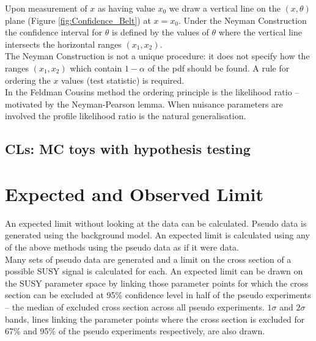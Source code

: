 Upon measurement of $x$ as having value $x_{0}$ we draw a vertical line on the 
$\left(x,\theta\right)$ plane (Figure \ref{fig:Confidence_Belt}) at $x = x_{0}$.
Under the Neyman Construction the confidence interval for $\theta$ is defined by
the values of $\theta$ where the vertical line intersects the horizontal ranges 
$\left(x_{1},x_{2}\right)$. \\

The Neyman Construction is not a unique procedure: it does not specify how the 
ranges $\left(x_{1},x_{2}\right)$ which contain $1 - \alpha$ of the pdf should
be found. A rule for ordering the $x$ values (test statistic) is required. \\

In the Feldman Cousins method the ordering principle is the likelihood ratio -- 
motivated by the Neyman-Pearson lemma. When nuisance parameters are involved the
profile likelihood ratio is the natural generalisation.

\subsection{CLs: MC toys with hypothesis testing}


\section{Expected and Observed Limit}

An expected limit without looking at the data can be calculated. Pseudo data is
generated using the background model. An expected limit is calculated using any
of the above methods using the pseudo data as if it were data. \\

Many sets of pseudo data are generated and a limit on the cross section of a 
possible SUSY signal is calculated for each. An expected limit can be drawn on 
the SUSY parameter space by linking those parameter points for which the cross 
section can be excluded at 95\% confidence level in half of the pseudo 
experiments -- the median of excluded cross section across all pseudo 
experiments. $1 \sigma$ and $2 \sigma$ bands, lines linking the parameter points
where the cross section is excluded for 67\% and 95\% of the pseudo experiments 
respectively, are also drawn.
